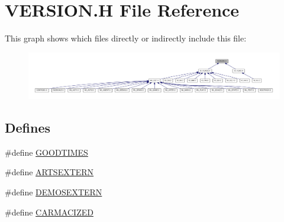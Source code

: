 \hypertarget{VERSION_8H}{
\section{VERSION.H File Reference}
\label{VERSION_8H}
}
This graph shows which files directly or indirectly include this file:
\nopagebreak
\begin{figure}[H]
\begin{center}
\leavevmode
\includegraphics[width=400pt]{VERSION_8H__dep__incl}
\end{center}
\end{figure}
\subsection*{Defines}
\begin{DoxyCompactItemize}
\item 
\#define \hyperlink{VERSION_8H_a3a7945b43181e458ece4deeac7949e73}{GOODTIMES}
\item 
\#define \hyperlink{VERSION_8H_a36e8622d432bb1dcfc61ac233148b685}{ARTSEXTERN}
\item 
\#define \hyperlink{VERSION_8H_aa38bbec192ab8931f108d382f7833c31}{DEMOSEXTERN}
\item 
\#define \hyperlink{VERSION_8H_ab1d0a23b2e2640f4fbf73f30b3586f1b}{CARMACIZED}
\end{DoxyCompactItemize}


